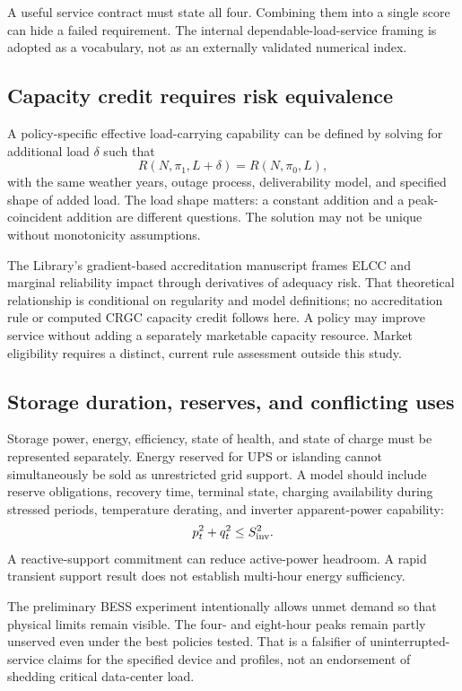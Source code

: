 \documentclass[11pt,letterpaper]{article}
\begin{document}
A useful service contract must state all four. Combining them into a single score can hide a failed requirement. The internal dependable-load-service framing is adopted as a vocabulary, not as an externally validated numerical index.

\subsection{Capacity credit requires risk equivalence}
A policy-specific effective load-carrying capability can be defined by solving for additional load $\delta$ such that
\begin{equation}
 R(N,\pi_1,L+\delta)=R(N,\pi_0,L),
 \label{eq:elcc}
\end{equation}
with the same weather years, outage process, deliverability model, and specified shape of added load. The load shape matters: a constant addition and a peak-coincident addition are different questions. The solution may not be unique without monotonicity assumptions.

The Library's gradient-based accreditation manuscript frames ELCC and marginal reliability impact through derivatives of adequacy risk.\cite{elcc} That theoretical relationship is conditional on regularity and model definitions; no accreditation rule or computed CRGC capacity credit follows here. A policy may improve service without adding a separately marketable capacity resource. Market eligibility requires a distinct, current rule assessment outside this study.

\subsection{Storage duration, reserves, and conflicting uses}
Storage power, energy, efficiency, state of health, and state of charge must be represented separately. Energy reserved for UPS or islanding cannot simultaneously be sold as unrestricted grid support. A model should include reserve obligations, recovery time, terminal state, charging availability during stressed periods, temperature derating, and inverter apparent-power capability:
\[
 p_t^2+q_t^2\le S_{\rm inv}^2.
\]
A reactive-support commitment can reduce active-power headroom. A rapid transient support result does not establish multi-hour energy sufficiency.

The preliminary BESS experiment intentionally allows unmet demand so that physical limits remain visible. The four- and eight-hour peaks remain partly unserved even under the best policies tested. That is a falsifier of uninterrupted-service claims for the specified device and profiles, not an endorsement of shedding critical data-center load.
\end{document}
